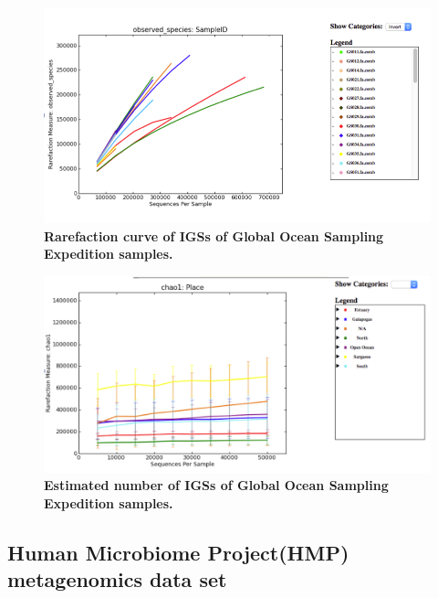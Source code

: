 \begin{figure}[!ht]
 \centerline{\includegraphics[width=7in]{./figures/GOS_observed.png}}
\caption{\bf Rarefaction curve of IGSs of Global Ocean Sampling Expedition
samples.}
\label{fig:GOS-rarefaction}
\end{figure}

\begin{figure}[!ht]
 \centerline{\includegraphics[width=7in]{./figures/GOS_chao.png}}
\caption{\bf Estimated number of IGSs of Global Ocean Sampling Expedition
 samples.}
\label{fig:GOS-chao1}
\end{figure}




\subsection{Human Microbiome Project(HMP) metagenomics data set}

